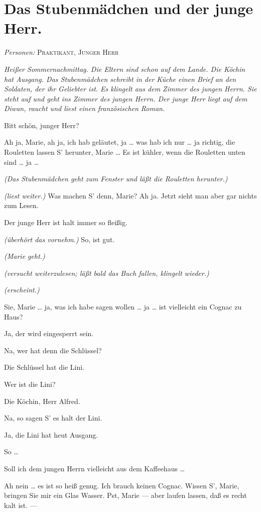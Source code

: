 \documentclass[
	final,
	a4paper,
	ngerman,
	mpinclude = true, %
	twoside = true,
	open = right,
	cleardoublepage = plain,
	DIV = 13,
	BCOR = 1cm,
	titlepage = firstiscover,
	]{scrbook}
\newcommand{\scene}{\section}
\newcommand{\direction}[1]{\textit{(#1)}}
\newcommand{\setting}[1]{\vspace{-0.5\baselineskip}\centering\textit{#1}}
\newcommand{\characterlist}[1]{{\begin{center}\textit{Personen:} #1\end{center}}}
\newcommand{\thecharacter}[1]{\textup{\textsc{#1}}\xspace}
\newcommand{\themaedchen}{\thecharacter{Praktikant}}
\newcommand{\theherr}{\thecharacter{Junger Herr}}
\newcommand{\character}[1]{\item[#1:]}
\newcommand{\maedchen}{\character{\themaedchen}}
\newcommand{\herr}{\character{\theherr}}
\begin{document}
\scene{Das Stubenmädchen und der junge Herr.}
\characterlist{\themaedchen, \theherr}
\setting{Heißer Sommernachmittag. Die Eltern sind schon auf dem Lande. Die Köchin hat Ausgang. Das Stubenmädchen schreibt in der Küche einen Brief an den Soldaten, der ihr Geliebter ist. Es klingelt aus dem Zimmer des jungen Herrn. Sie steht auf und geht ins Zimmer des jungen Herrn. Der junge Herr liegt auf dem Diwan, raucht und liest einen französischen Roman.}
\begin{play}
	\maedchen
	Bitt schön, junger Herr?

	\herr
	Ah ja, Marie, ah ja, ich hab geläutet, ja \ldots{} was hab ich nur \ldots{} ja richtig, die Rouletten lassen S' herunter, Marie \ldots{} Es ist kühler, wenn die Rouletten unten sind \ldots{} ja \ldots{}

	\direction{Das Stubenmädchen geht zum Fenster und läßt die Rouletten herunter.}

	\herr
	\direction{liest weiter.} Was machen S' denn, Marie? Ah ja. Jetzt sieht man aber gar nichts zum Lesen.

	\maedchen
	Der junge Herr ist halt immer so fleißig.

	\herr
	\direction{überhört das vornehm.} So, ist gut.

	\direction{Marie geht.}

	\herr
	\direction{versucht weiterzulesen; läßt bald das Buch fallen, klingelt wieder.}

	\maedchen
	\direction{erscheint.}

	\herr
	Sie, Marie \ldots{} ja, was ich habe sagen wollen \ldots{} ja \ldots{} ist vielleicht ein Cognac zu Haus?

	\maedchen
	Ja, der wird eingesperrt sein.

	\herr
	Na, wer hat denn die Schlüssel?

	\maedchen
	Die Schlüssel hat die Lini.

	\herr
	Wer ist die Lini?

	\maedchen
	Die Köchin, Herr Alfred.

	\herr
	Na, so sagen S' es halt der Lini.

	\maedchen
	Ja, die Lini hat heut Ausgang.

	\herr
	So \ldots{}

	\maedchen
	Soll ich dem jungen Herrn vielleicht aus dem Kaffeehaus \ldots{}

	\herr
	Ah nein \ldots{} es ist so heiß genug. Ich brauch keinen Cognac. Wissen S', Marie, bringen Sie mir ein Glas Wasser. Pst, Marie --- aber laufen lassen, daß es recht kalt ist. ---


\end{play}
\end{document}
